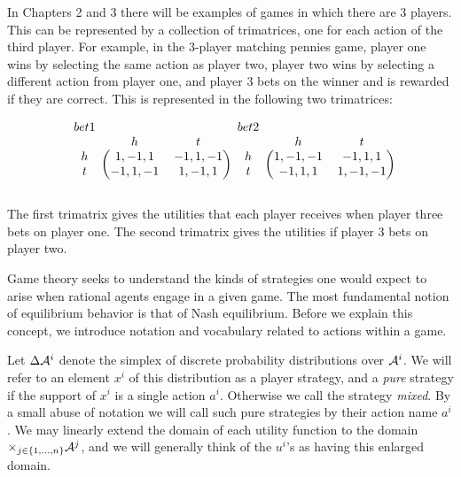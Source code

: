 In Chapters 2 and 3 there will be examples of games in which there are 3 players. This can be represented by a collection of trimatrices, one for each action of the third player. For example, in the 3-player matching pennies game, player one wins by selecting the same action as player two, player two wins by selecting a different action from player one, and player 3 bets on the winner and is rewarded if they are correct. This is represented in the following two trimatrices:

\begin{equation}

   \begin{blockarray}{ccc}
   bet 1 \\
 & h & t \\
\begin{block}{c(cc)}
  h & 1,-1,1 & -1,1,-1 \\
  t & -1,1,-1 & 1,-1,1 \\
\end{block}
\end{blockarray} 

\vspace{.2in}

   \begin{blockarray}{ccc}
   bet 2 \\
 & h & t \\
\begin{block}{c(cc)}
  h & 1,-1,-1 & -1,1,1 \\
  t & -1,1,1 & 1,-1,-1 \\
\end{block}
\end{blockarray} 
\label{eq:matchpen3}

\end{equation}

The first trimatrix gives the utilities that each player receives when player three bets on player one. The second trimatrix gives the utilities if player 3 bets on player two.

Game theory seeks to understand the kinds of strategies one would expect to arise when rational agents engage in a given game. The most fundamental notion of equilibrium behavior is that of Nash equilibrium. Before we explain this concept, we introduce notation and vocabulary related to actions within a game.


Let $\Delta \AA^i$ denote the simplex of discrete probability distributions over $\AA^i$. We will refer to an element $x^i$ of this distribution as a player strategy, and a {\em pure} strategy if the support of $x^i$ is a single action $a^i$. Otherwise we call the strategy {\em mixed}. By a small abuse of notation we will call such pure strategies by their action name $a^i$. We may linearly extend the domain of each utility function to the domain $\times_{j \in \{1, \ldots, n\}}  \AA^j$, and we will generally think of the $u^i$'s as having this enlarged domain.

